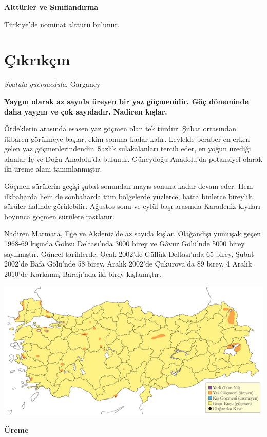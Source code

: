 \documentclass[
  letterpaper,
  DIV=11,
  numbers=noendperiod]{scrreprt}
\begin{document}
\textbf{Alttürler ve Sınıflandırma}

Türkiye'de nominat alttürü bulunur.

\section{Çıkrıkçın}\label{uxe7ux131krux131kuxe7ux131n}

\emph{Spatula querquedula}, Garganey

\textbf{Yaygın olarak az sayıda üreyen bir yaz göçmenidir. Göç döneminde
daha yaygın ve çok sayıdadır. Nadiren kışlar.}

Ördeklerin arasında esasen yaz göçmen olan tek türdür. Şubat ortasından
itibaren görülmeye başlar, ekim sonuna kadar kalır. Leylekle beraber en
erken gelen yaz göçmenlerindendir. Sazlık sulakalanları tercih eder, en
yoğun ürediği alanlar İç ve Doğu Anadolu'da bulunur. Güneydoğu
Anadolu'da potansiyel olarak iki üreme alanı tanımlanmıştır.

Göçmen sürülerin geçişi şubat sonundan mayıs sonuna kadar devam eder.
Hem ilkbaharda hem de sonbaharda tüm bölgelerde yüzlerce, hatta binlerce
bireylik sürüler halinde görülebilir. Ağustos sonu ve eylül başı
arasında Karadeniz kıyıları boyunca göçmen sürülere rastlanır.

Nadiren Marmara, Ege ve Akdeniz'de az sayıda kışlar. Olağandışı yumuşak
geçen 1968-69 kışında Göksu Deltası'nda 3000 birey ve Gâvur Gölü'nde
5000 birey sayılmıştır. Güncel tarihlerde; Ocak 2002'de Güllük
Deltası'nda 65 birey, Şubat 2002'de Bafa Gölü'nde 58 birey, Aralık
2002'de Çukurova'da 89 birey, 4 Aralık 2010'de Karkamış Barajı'nda iki
birey kışlamıştır.

\includegraphics{images/harita_Page_019.png}

\textbf{Üreme}
\end{document}
